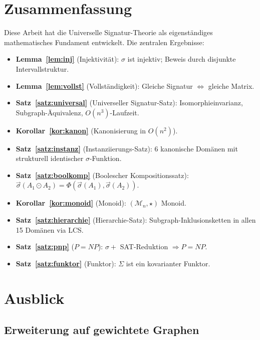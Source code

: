 ﻿\documentclass[a4paper,12pt]{article}
\theoremstyle{definition}
\begin{document}
\section{Zusammenfassung}

Diese Arbeit hat die Universelle Signatur-Theorie als eigenst\"andiges
mathematisches Fundament entwickelt. Die zentralen Ergebnisse:

\begin{itemize}
    \item \textbf{Lemma~\ref{lem:inj}} (Injektivit\"at): $\sigma$ ist injektiv;
          Beweis durch disjunkte Intervallstruktur.
    \item \textbf{Lemma~\ref{lem:vollst}} (Vollst\"andigkeit): Gleiche Signatur
          $\Leftrightarrow$ gleiche Matrix.
    \item \textbf{Satz~\ref{satz:universal}} (Universeller Signatur-Satz):
          Isomorphieinvarianz, Subgraph-\"Aquivalenz, $O(n^3)$-Laufzeit.
    \item \textbf{Korollar~\ref{kor:kanon}} (Kanonisierung in $O(n^2)$).
    \item \textbf{Satz~\ref{satz:instanz}} (Instanziierungs-Satz):
          6 kanonische Domänen mit strukturell identischer $\sigma$-Funktion.
    \item \textbf{Satz~\ref{satz:boolkomp}} (Boolescher Kompositionssatz):
          $\vec{\sigma}(A_1 \odot A_2) = \Phi(\vec{\sigma}(A_1), \vec{\sigma}(A_2))$.
    \item \textbf{Korollar~\ref{kor:monoid}} (Monoid): $(\mathcal{M}_n, \star)$ Monoid.
    \item \textbf{Satz~\ref{satz:hierarchie}} (Hierarchie-Satz):
          Subgraph-Inklusionsketten in allen 15 Domänen via LCS.
    \item \textbf{Satz~\ref{satz:pnp}} ($P=NP$): $\sigma + $ SAT-Reduktion
          $\Rightarrow P = NP$.
    \item \textbf{Satz~\ref{satz:funktor}} (Funktor): $\Sigma$ ist ein
          kovarianter Funktor.
\end{itemize}

\section{Ausblick}

\subsection{Erweiterung auf gewichtete Graphen}
\end{document}
